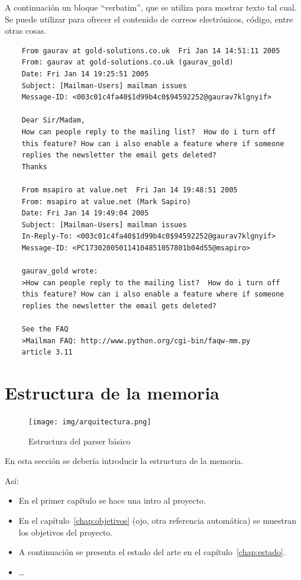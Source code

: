 \documentclass[a4paper, 12pt]{book}
\begin{document}
A continuación un bloque ``verbatim'', que se utiliza para mostrar texto tal cual.
Se puede utilizar para ofrecer el contenido de correos electrónicos, código, entre otras cosas.


{\footnotesize
\begin{verbatim}
    From gaurav at gold-solutions.co.uk  Fri Jan 14 14:51:11 2005
    From: gaurav at gold-solutions.co.uk (gaurav_gold)
    Date: Fri Jan 14 19:25:51 2005
    Subject: [Mailman-Users] mailman issues
    Message-ID: <003c01c4fa40$1d99b4c0$94592252@gaurav7klgnyif>

    Dear Sir/Madam,
    How can people reply to the mailing list?  How do i turn off
    this feature? How can i also enable a feature where if someone
    replies the newsletter the email gets deleted?
    Thanks

    From msapiro at value.net  Fri Jan 14 19:48:51 2005
    From: msapiro at value.net (Mark Sapiro)
    Date: Fri Jan 14 19:49:04 2005
    Subject: [Mailman-Users] mailman issues
    In-Reply-To: <003c01c4fa40$1d99b4c0$94592252@gaurav7klgnyif>
    Message-ID: <PC173020050114104851057801b04d55@msapiro>

    gaurav_gold wrote:
    >How can people reply to the mailing list?  How do i turn off
    this feature? How can i also enable a feature where if someone
    replies the newsletter the email gets deleted?

    See the FAQ
    >Mailman FAQ: http://www.python.org/cgi-bin/faqw-mm.py
    article 3.11
\end{verbatim}
}



\section{Estructura de la memoria}
\label{sec:estructura}


\begin{figure}
  \centering
  \texttt{[image: img/arquitectura.png]}
  \caption{Estructura del parser básico}
  \label{fig:arquitectura}
\end{figure}




En esta sección se debería introducir la estructura de la memoria. 

Así:


\begin{itemize}
  \item En el primer capítulo se hace una intro al proyecto.
  
  \item En el capítulo~\ref{chap:objetivos} (ojo, otra referencia automática) se muestran los objetivos del proyecto.
  
  \item A continuación se presenta el estado del arte en el capítulo~\ref{chap:estado}.
  
  \item \ldots
\end{itemize}
\end{document}

